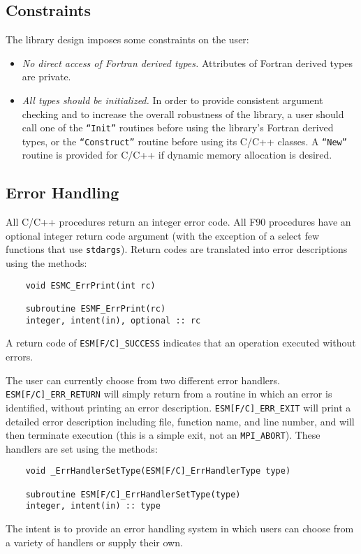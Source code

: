 \subsection{Constraints}

The library design imposes some constraints on the user:

\begin{itemize}
\item {\it No direct access of Fortran derived types.}  Attributes
of Fortran derived types are private.

\item{\it All types should be initialized.} In order to provide consistent
argument checking and to increase the overall robustness of the library,
a user should call one of the {\tt ``Init''} routines before using the
library's Fortran derived types, or the {\tt ``Construct''} routine before 
using its C/C++ classes.  A {\tt ``New''} routine is provided for C/C++ if
dynamic memory allocation is desired.

\end{itemize}

\subsection{Error Handling}

All C/C++ procedures return an integer error code.  All F90 procedures have 
an optional integer return code argument (with the exception of a select few
functions that use {\tt stdargs}).  Return codes are translated 
into error descriptions using the methods: 

\begin{verbatim}
    void ESMC_ErrPrint(int rc)

    subroutine ESMF_ErrPrint(rc)  
    integer, intent(in), optional :: rc
\end{verbatim}

A return code of {\tt ESM[F/C]\_SUCCESS} indicates that an 
operation executed without errors.

The user can currently choose from two different error handlers.
{\tt ESM[F/C]\_ERR\_RETURN} will simply return from a routine in which an error 
is identified, without printing an error description.
{\tt ESM[F/C]\_ERR\_EXIT} will print a detailed error description including
file, function name, and line number, and will then terminate execution
(this is a simple exit, not an {\tt MPI\_ABORT}).  These handlers are set 
using the methods: 
\begin{verbatim}
    void _ErrHandlerSetType(ESM[F/C]_ErrHandlerType type)

    subroutine ESM[F/C]_ErrHandlerSetType(type)
    integer, intent(in) :: type
\end{verbatim}

The intent is to provide an error handling system in which
users can choose from a variety of handlers or supply their own.






